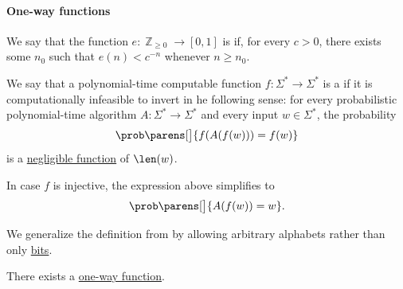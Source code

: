 \paragraph{One-way functions}

\begin{definition}\label{def:negligible_function}
  We say that the function \( e: \BbbZ_{\geq 0} \to [0, 1] \) is  if, for every \( c > 0 \), there exists some \( n_0 \) such that \( e(n) < c^{-n} \) whenever \( n \geq n_0 \).
\end{definition}

\begin{definition}\label{def:one_way_function}
  We say that a polynomial-time computable function \( f: \Sigma^* \to \Sigma^* \) is a  if it is computationally infeasible to invert in he following sense: for every probabilistic polynomial-time algorithm \( A: \Sigma^* \to \Sigma^* \) and every input \( w \in \Sigma^* \), the probability
  \begin{equation*}
    \prob\parens[\big]{ f(A(f(w))) = f(w) }
  \end{equation*}
  is a \hyperref[def:negligible_function]{negligible function} of \( \len(w) \).

  In case \( f \) is injective, the expression above simplifies to
  \begin{equation*}
    \prob\parens[\big]{ A(f(w)) = w }.
  \end{equation*}
\end{definition}
\begin{comments}
  \item We generalize the definition from \cite[def. 9.4]{AroraBarak2009ComputationalComplexity} by allowing arbitrary alphabets rather than only \hyperref[def:positional_number_system/binary]{bits}.
\end{comments}

\begin{conjecture}\label{hyp:one_way_function_existence}
  There exists a \hyperref[def:one_way_function]{one-way function}.
\end{conjecture}

